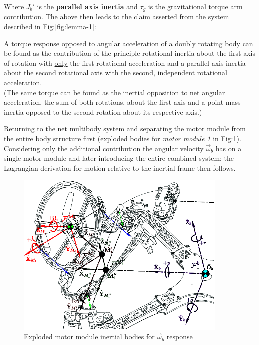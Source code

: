 Where $J_b'$ is the \underline{\textbf{parallel axis inertia}} and $\tau_g$ is the gravitational torque arm contribution. The above then leads to the claim asserted from the system described in Fig:\ref{fig:lemma-1}:
\begin{axiom}\label{lem:1}
A torque response opposed to angular acceleration of a doubly rotating body can be found as the contribution of the principle rotational inertia about the first axis of rotation with \underline{only} the first rotational acceleration and a parallel axis inertia about the second rotational axis with the second, independent rotational acceleration.
\\
(The same torque can be found as the inertial opposition to net angular acceleration, the sum of both rotations, about the first axis and a point mass inertia opposed to the second rotation about its respective axis.)
\end{axiom}
Returning to the net multibody system and separating the motor module from the entire body structure first (exploded bodies for \emph{motor module 1} in Fig:\ref{fig:response-body}). Considering only the additional contribution the angular velocity $\vec{\omega}_b$ has on a single motor module and later introducing the entire combined system; the Lagrangian derivation for motion relative to the inertial frame then follows.
\par
\begin{figure}[htbp]
\vspace{-12pt}
\centering
\includegraphics[width=0.9\textwidth]{figs/response-body}
\vspace{-8pt}
\caption{Exploded motor module inertial bodies for $\vec{\omega}_b$ response}
\label{fig:response-body}
\vspace{-18pt}
\end{figure}
